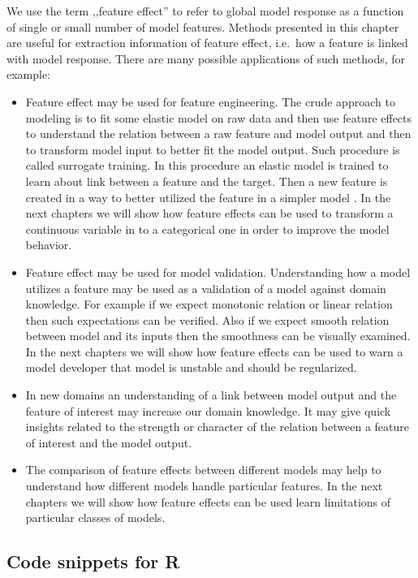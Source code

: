 \documentclass[12pt,]{krantz}
\providecommand{\tightlist}{%
  \setlength{\itemsep}{0pt}\setlength{\parskip}{0pt}}
\begin{document}
We use the term ,,feature effect'' to refer to global model response as a function of single or small number of model features.
Methods presented in this chapter are useful for extraction information of feature effect, i.e.~how a feature is linked with model response. There are many possible applications of such methods, for example:

\begin{itemize}
\tightlist
\item
  Feature effect may be used for feature engineering. The crude approach to modeling is to fit some elastic model on raw data and then use feature effects to understand the relation between a raw feature and model output and then to transform model input to better fit the model output. Such procedure is called surrogate training. In this procedure an elastic model is trained to learn about link between a feature and the target. Then a new feature is created in a way to better utilized the feature in a simpler model \citep{SAFE-arxiv}. In the next chapters we will show how feature effects can be used to transform a continuous variable in to a categorical one in order to improve the model behavior.
\item
  Feature effect may be used for model validation. Understanding how a model utilizes a feature may be used as a validation of a model against domain knowledge. For example if we expect monotonic relation or linear relation then such expectations can be verified. Also if we expect smooth relation between model and its inputs then the smoothness can be visually examined. In the next chapters we will show how feature effects can be used to warn a model developer that model is unstable and should be regularized.
\item
  In new domains an understanding of a link between model output and the feature of interest may increase our domain knowledge. It may give quick insights related to the strength or character of the relation between a feature of interest and the model output.
\item
  The comparison of feature effects between different models may help to understand how different models handle particular features. In the next chapters we will show how feature effects can be used learn limitations of particular classes of models.
\end{itemize}

\hypertarget{ALPR}{%
\subsection{Code snippets for R}\label{ALPR}}
\end{document}
